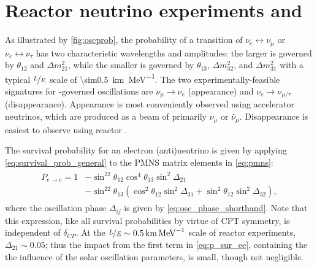 \section{Reactor neutrino experiments and \texorpdfstring{\thetaot}{theta13}}
\label{sec:experiment_intro}

As illustrated by \cref{fig:oscprob},
the probability of a transition of $\nu_e \leftrightarrow \nu_\mu$
or $\nu_e \leftrightarrow \nu_\tau$
has two characteristic wavelengths and amplitudes:
the larger is governed by $\theta_{12}$ and $\Delta m^2_{21}$,
while the smaller is governed by
$\theta_{13}$, $\Delta m^2_{32}$, and $\Delta m^2_{31}$
with a typical $\nicefrac{L}{E}$ scale of \SI{\sim0.5}{\km\per\MeV}.
The two experimentally-feasible signatures for \thetaot{}-governed oscillations
are $\nu_\mu\to\nu_e$ (appearance) and $\nu_e\to\nu_{\mu/\tau}$ (disappearance).
Appearance is most conveniently observed using accelerator neutrinos,
which are produced as a beam of primarily $\nu_\mu$ or $\bar{\nu}_\mu$.
Disappearance is easiest to observe using reactor \nuebar.

The survival probability for an electron (anti)neutrino
is given by applying \cref{eq:survival_prob_general}
to the PMNS matrix elements in \cref{eq:pmns}:
\begin{align}\label{eq:p_sur_ee}
    \begin{split}
        P_{e\to e} = 1 &-
        \sin^22\theta_{12}\cos^4\theta_{13}
        \sin^2\Delta_{21} \\
                       &-
        \sin^22\theta_{13}(\cos^2\theta_{12}
        \sin^2\Delta_{31}
                       +
        \sin^2\theta_{12}
        \sin^2\Delta_{32}
        ),
    \end{split}
\end{align}
where the oscillation phase $\Delta_{ij}$ is given by \cref{eq:osc_phase_shorthand}.
Note that this expression, like all survival probabilities by virtue of CPT symmetry,
is independent of $\delta_{CP}$.
At the $\nicefrac{L}{E}\sim\SI{0.5}{\km\per\MeV}$ scale of reactor experiments,
$\Delta_{21} \sim 0.05$;
thus the impact from the first term in \cref{eq:p_sur_ee},
containing the the influence of the solar oscillation parameters,
is small, though not negligible.

